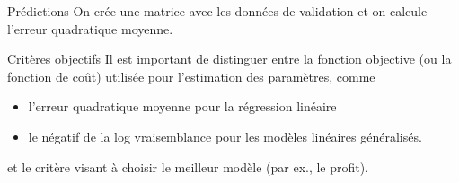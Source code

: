 \documentclass[
  ignorenonframetext,
]{beamer}
\newenvironment{Shaded}{\begin{snugshade}}{\end{snugshade}}
\newcommand{\AttributeTok}[1]{\textcolor[rgb]{0.40,0.45,0.13}{#1}}
\newcommand{\CommentTok}[1]{\textcolor[rgb]{0.37,0.37,0.37}{#1}}
\newcommand{\DecValTok}[1]{\textcolor[rgb]{0.68,0.00,0.00}{#1}}
\newcommand{\FunctionTok}[1]{\textcolor[rgb]{0.28,0.35,0.67}{#1}}
\newcommand{\NormalTok}[1]{\textcolor[rgb]{0.00,0.23,0.31}{#1}}
\newcommand{\OtherTok}[1]{\textcolor[rgb]{0.00,0.23,0.31}{#1}}
\newcommand{\SpecialCharTok}[1]{\textcolor[rgb]{0.37,0.37,0.37}{#1}}
\providecommand{\tightlist}{%
  \setlength{\itemsep}{0pt}\setlength{\parskip}{0pt}}
\begin{document}
\begin{frame}[fragile]{Prédictions}
\protect{}\label{pruxe9dictions}
On crée une matrice avec les données de validation et on calcule
l'erreur quadratique moyenne.

\footnotesize

\begin{Shaded}
\end{Shaded}

\normalsize
\end{frame}

\begin{frame}{Critères objectifs}
\protect{}\label{crituxe8res-objectifs}
Il est important de distinguer entre la fonction objective (ou la
fonction de coût) utilisée pour l'estimation des paramètres, comme

\begin{itemize}
\tightlist
\item
  l'erreur quadratique moyenne pour la régression linéaire
\item
  le négatif de la log vraisemblance pour les modèles linéaires
  généralisés.
\end{itemize}

et le critère visant à choisir le meilleur modèle (par ex., le profit).
\end{frame}
\end{document}
